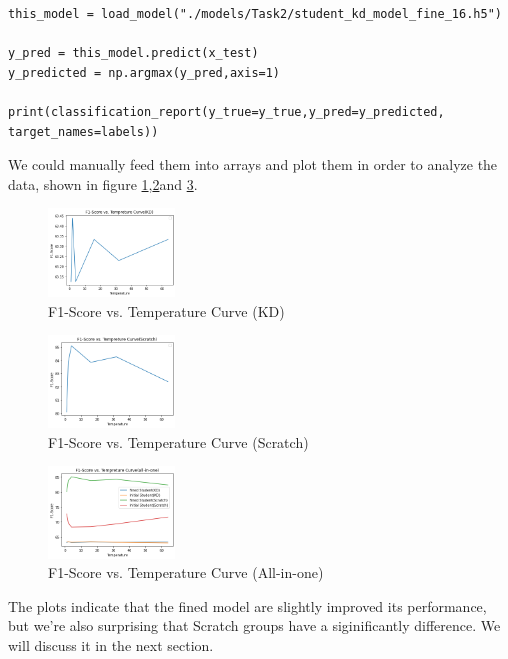 \documentclass[conference]{IEEEtran}
\begin{document}
\begin{lstlisting}
this_model = load_model("./models/Task2/student_kd_model_fine_16.h5")

y_pred = this_model.predict(x_test)
y_predicted = np.argmax(y_pred,axis=1)

print(classification_report(y_true=y_true,y_pred=y_predicted, target_names=labels))
\end{lstlisting}

We could manually feed them into arrays and plot them in order to analyze the data, shown in figure \ref{kd-f1},\ref{nokd-f1}and \ref{allinone-f1}.

\begin{figure}[h] 
    \centering
    \includegraphics[width=0.3\textwidth]{./graphs/Task2/kd-f1.png}
    \caption{F1-Score vs. Temperature Curve (KD)}
    \label{kd-f1}
\end{figure}
\begin{figure}[h] 
    \centering
    \includegraphics[width=0.3\textwidth]{./graphs/Task2/nokd-f1.png}
    \caption{F1-Score vs. Temperature Curve (Scratch)}
    \label{nokd-f1}
\end{figure}
\begin{figure}[h] 
    \centering
    \includegraphics[width=0.3\textwidth]{./graphs/Task2/allinone-f1.png}
    \caption{F1-Score vs. Temperature Curve (All-in-one)}
    \label{allinone-f1}
\end{figure}

The plots indicate that the fined model are slightly improved its performance, but we're also surprising that Scratch groups have a siginificantly difference. We will discuss it in the next section.
\end{document}
